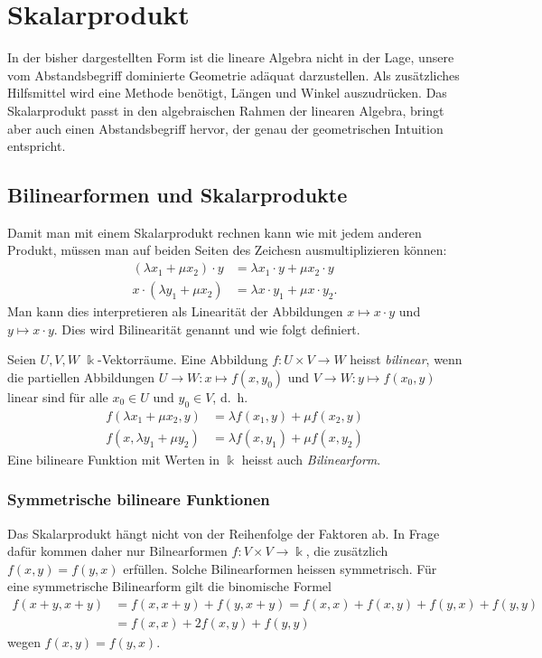 %
%
%
\section{Skalarprodukt
\label{buch:section:skalarprodukt}}
In der bisher dargestellten Form ist die lineare Algebra nicht
in der Lage, unsere vom Abstandsbegriff dominierte Geometrie adäquat
darzustellen.
Als zusätzliches Hilfsmittel wird eine Methode benötigt, Längen
und Winkel auszudrücken.
Das Skalarprodukt passt in den algebraischen Rahmen der
linearen Algebra, bringt aber auch einen Abstandsbegriff hervor,
der genau der geometrischen Intuition entspricht.

\subsection{Bilinearformen und Skalarprodukte
\label{buch:subsection:bilinearformen}}
Damit man mit einem Skalarprodukt rechnen kann wie mit jedem anderen
Produkt, müssen man auf beiden Seiten des Zeichesn ausmultiplizieren können:
\begin{align*}
(\lambda x_1 + \mu x_2)\cdot y &= \lambda x_1\cdot y + \mu x_2\cdot y\\
x\cdot (\lambda y_1 + \mu x_2) &= \lambda x\cdot y_1 + \mu x\cdot y_2.
\end{align*}
Man kann dies interpretieren als Linearität der Abbildungen 
$x\mapsto x\cdot y$ und $y\mapsto x\cdot y$.
Dies wird Bilinearität genannt und wie folgt definiert.

\begin{definition}
Seien $U,V,W$ $\Bbbk$-Vektorräume.
Eine Abbildung $f\colon U\times V\to W$  heisst {\em bilinear},
%
wenn die partiellen Abbildungen $U\to W:x\mapsto f(x,y_0)$ und
$V\to W:y\mapsto f(x_0,y)$
linear sind für alle $x_0\in U$ und $y_0\in V$, d.~h.
\begin{align*}
f(\lambda x_1 + \mu x_2,y) &= \lambda f(x_1,y) + \mu f(x_2,y)
\\
f(x,\lambda y_1 + \mu y_2) &= \lambda f(x,y_1) + \mu f(x,y_2)
\end{align*}
Eine bilineare Funktion mit Werten in $\Bbbk$ heisst auch {\em Bilinearform}.
%
\end{definition}

\subsubsection{Symmetrische bilineare Funktionen}
Das Skalarprodukt hängt nicht von der Reihenfolge der Faktoren ab.
In Frage dafür kommen daher nur Bilnearformen $f\colon V\times V\to\Bbbk$,
die zusätzlich $f(x,y)=f(y,x)$ erfüllen.
Solche Bilinearformen heissen symmetrisch.
Für eine symmetrische Bilinearform gilt die binomische Formel
\begin{align*}
f(x+y,x+y)
&=
f(x,x+y)+f(y,x+y)
=
f(x,x)+f(x,y)+f(y,x)+f(y,y)
\\
&=
f(x,x)+2f(x,y)+f(y,y)
\end{align*}
wegen $f(x,y)=f(y,x)$.

